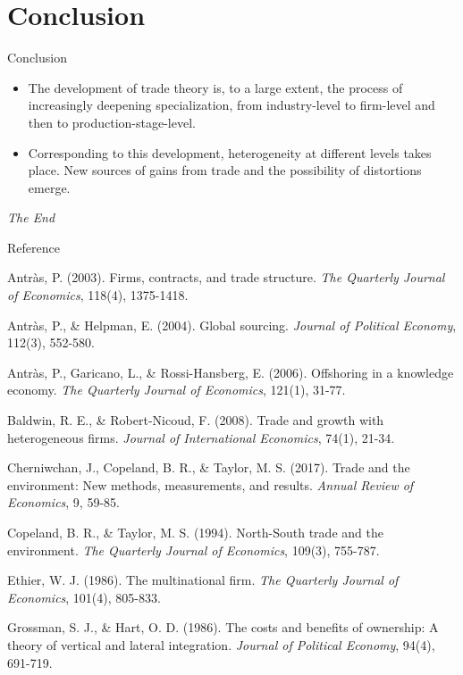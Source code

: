 \documentclass{beamer}
\begin{document}
\section{Conclusion}
\begin{frame}[shrink]
	\transfade %
	\tableofcontents[sectionstyle=show/shaded,subsectionstyle=show/shaded/hide]
	\addtocounter{framenumber}{-1}
\end{frame}
\begin{frame}{Conclusion}
	\begin{itemize}
		\item The development of trade theory is, to a large extent, the process of increasingly deepening specialization, from industry-level to firm-level and then to production-stage-level.
		\medskip
		\item Corresponding to this development, heterogeneity at different levels takes place. New sources of gains from trade and the possibility of distortions emerge.
	\end{itemize}
\end{frame}
\begin{frame}
	\addtocounter{framenumber}{-1}
	\Huge{\centerline{\textit{The End}}}
\end{frame}
\begin{frame}{Reference}
	\addtocounter{framenumber}{-1}
	\footnotesize
	Antr\`as, P. (2003). Firms, contracts, and trade structure. \textit{The Quarterly Journal of Economics}, 118(4), 1375-1418.

	Antr\`as, P., \& Helpman, E. (2004). Global sourcing. \textit{Journal of Political Economy}, 112(3), 552-580.

	Antr\`as, P., Garicano, L., \& Rossi-Hansberg, E. (2006). Offshoring in a knowledge economy. \textit{The Quarterly Journal of Economics}, 121(1), 31-77.

	Baldwin, R. E., \& Robert-Nicoud, F. (2008). Trade and growth with heterogeneous firms. \textit{Journal of International Economics}, 74(1), 21-34.

	Cherniwchan, J., Copeland, B. R., \& Taylor, M. S. (2017). Trade and the environment: New methods, measurements, and results. \textit{Annual Review of Economics}, 9, 59-85.

	Copeland, B. R., \& Taylor, M. S. (1994). North-South trade and the environment. \textit{The Quarterly Journal of Economics}, 109(3), 755-787.

	Ethier, W. J. (1986). The multinational firm. \textit{The Quarterly Journal of Economics}, 101(4), 805-833.

	Grossman, S. J., \& Hart, O. D. (1986). The costs and benefits of ownership: A theory of vertical and lateral integration. \textit{Journal of Political Economy}, 94(4), 691-719.
\end{frame}
\end{document}
